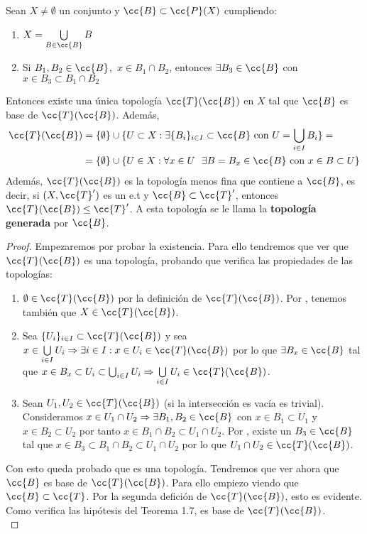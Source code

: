 \begin{teo}\label{teorema1_7}
    Sean $X\neq \emptyset$ un conjunto y $\cc{B}\subset \cc{P}(X)$ cumpliendo:
    \begin{enumerate}
        \item[\apuntar{B1}] $X=\bigcup\limits_{B\in \cc{B}}B$
        \item[\apuntar{B2}] Si $B_1,B_2\in \cc{B}$,\ $x\in B_1\cap B_2$, entonces $\exists B_3 \in \cc{B}$ con $x\in B_3 \subset B_1 \cap B_2$
    \end{enumerate}
    Entonces existe una única topología $\cc{T}(\cc{B})$ en $X$ tal que $\cc{B}$ es base de $\cc{T}(\cc{B})$. Además,
    \begin{align*}
        \cc{T}(\cc{B})&=\{\emptyset\}\cup\{U\subset X : \exists \{B_i\}_{i\in I}\subset \cc{B} \text{ con } U = \bigcup\limits_{i\in I}B_i\}=\\
        &=\{\emptyset\}\cup \{U\in X:\forall x\in U\ \ \exists B=B_x\in \cc{B} \text{ con } x\in B\subset U \}
    \end{align*}
    Además, $\cc{T}(\cc{B})$ es la topología menos fina que contiene a $\cc{B}$, es decir, si $(X,\cc{T}')$ es un e.t y $\cc{B}\subset \cc{T}'$, entonces $\cc{T}(\cc{B})\leq \cc{T}'$. A esta topología se le llama la \textbf{topología generada} por $\cc{B}$.

    \begin{proof}
        Empezaremos por probar la existencia. Para ello tendremos que ver que $\cc{T}(\cc{B})$ es una topología, probando que verifica las propiedades de las topologías:
        \begin{enumerate}[label=(A\arabic*)]
            \item $\emptyset\in \cc{T}(\cc{B})$ por la definición de $\cc{T}(\cc{B})$. Por , tenemos también que $X\in \cc{T}(\cc{B})$.
            \item Sea $\{U_i\}_{i\in I}\subset \cc{T}(\cc{B})$ y sea $x\in \bigcup\limits_{i\in I}U_i\Rightarrow \exists i \in I : x\in U_i\in \cc{T}(\cc{B})$ por lo que $\exists B_x\in \cc{B}$ tal que $x \in B_x \subset U_i\subset \bigcup_{i\in I}U_i\Rightarrow \bigcup\limits_{i\in I}U_i \in \cc{T}(\cc{B})$.
            \item Sean $U_1, U_2 \in \cc{T}(\cc{B})$ (si la intersección es vacía es trivial). Consideramos $x\in U_1\cap U_2\Rightarrow \exists B_1, B_2 \in \cc{B}$ con $x \in B_1 \subset U_1$ y $x \in B_2\subset U_2$ por tanto $x\in B_1 \cap B_2 \subset U_1 \cap U_2$. Por , existe un $B_3\in \cc{B}$ tal que $x\in B_3 \subset B_1\cap B_2 \subset U_1 \cap U_2$ por lo que $U_1\cap U_2\in \cc{T}(\cc{B})$.
        \end{enumerate}
        Con esto queda probado que es una topología. Tendremos que ver ahora que $\cc{B}$ es base de $\cc{T}(\cc{B})$. Para ello empiezo viendo que $\cc{B}\subset \cc{T}$. Por la segunda defición de $\cc{T}(\cc{B})$, esto es evidente. Como verifica las hipótesis del Teorema 1.7, es base de $\cc{T}(\cc{B})$.\\


\end{proof}
\end{teo}
